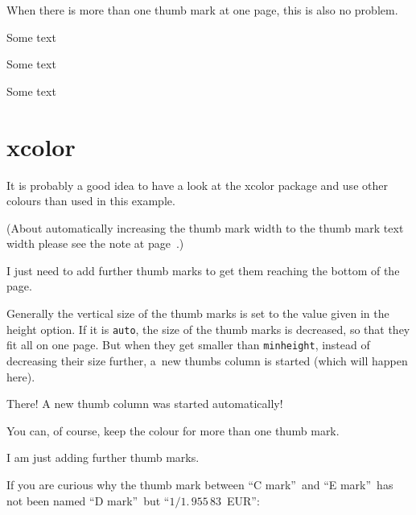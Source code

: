 \documentclass[twoside,british]{article}[2007/10/19]%
\begin{document}
\bigskip

When there is more than one thumb mark at one page, this is also no problem.

\newpage

Some text

\newpage

Some text

\newpage

Some text

\newpage

\section{xcolor}

It is probably a good idea to have a look at the \textsf{xcolor} package
and use other colours than used in this example.

(About automatically increasing the thumb mark width to the thumb mark text
width please see the note at page~\pageref{HugeText}.)

\newpage


I just need to add further thumb marks to get them reaching the bottom of the page.

Generally the vertical size of the thumb marks is set to the value given in the
height option. If it is \texttt{auto}, the size of the thumb marks is decreased,
so that they fit all on one page. But when they get smaller than \texttt{minheight},
instead of decreasing their size further, a~new thumbs column is started
(which will happen here).

\newpage


There! A new thumb column was started automatically!

\newpage


You can, of course, keep the colour for more than one thumb mark.

\newpage


I am just adding further thumb marks.

If you are curious why the thumb mark between
\textquotedblleft C mark\textquotedblright\ and \textquotedblleft E mark\textquotedblright\ has
not been named \textquotedblleft D mark\textquotedblright\ but
\textquotedblleft $1/1.\,955\,83$\, EUR\textquotedblright :
\end{document}
